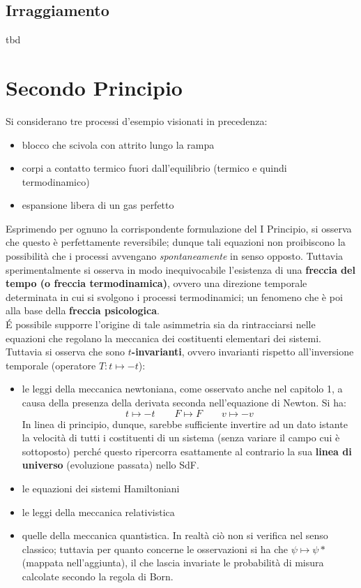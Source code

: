 \documentclass[10pt, oneside]{book}
\begin{document}
\section{Irraggiamento}
tbd

\chapter{Secondo Principio}
Si considerano tre processi d'esempio visionati in precedenza: 
\begin{itemize}
\item blocco che scivola con attrito lungo la rampa
\item corpi a contatto termico fuori dall'equilibrio (termico e quindi termodinamico)
\item espansione libera di un gas perfetto
\end{itemize}
Esprimendo per ognuno la corrispondente formulazione del I Principio, si osserva che questo è perfettamente reversibile; dunque tali equazioni non proibiscono la possibilità che i processi avvengano \textit{spontaneamente} in senso opposto. Tuttavia sperimentalmente si osserva in modo inequivocabile l'esistenza di una \textbf{freccia del tempo (o freccia termodinamica)}, ovvero una direzione temporale determinata in cui si svolgono i processi termodinamici; un fenomeno che è poi alla base della \textbf{freccia psicologica}.\\
\'E possibile supporre l'origine di tale asimmetria sia da rintracciarsi nelle equazioni che regolano la meccanica dei costituenti elementari dei sistemi. Tuttavia si osserva che sono \textbf{$t$-invarianti}, ovvero invarianti rispetto all'inversione temporale (operatore $T: t \mapsto -t$):
\begin{itemize}
\item le leggi della meccanica newtoniana, come osservato anche nel capitolo 1, a causa della presenza della derivata seconda nell'equazione di Newton. Si ha:
\[t \mapsto -t \quad \quad F \mapsto F \quad \quad v \mapsto -v\]
In linea di principio, dunque, sarebbe sufficiente invertire ad un dato istante la velocità di tutti i costituenti di un sistema (senza variare il campo cui è sottoposto) perché questo ripercorra esattamente al contrario la sua \textbf{linea di universo} (evoluzione passata) nello SdF.
\item le equazioni dei sistemi Hamiltoniani
\item le leggi della meccanica relativistica
\item quelle della meccanica quantistica. In realtà ciò non si verifica nel senso classico; tuttavia per quanto concerne le osservazioni si ha che $\psi \mapsto \psi*$ (mappata nell'aggiunta), il che lascia invariate le probabilità di misura calcolate secondo la regola di Born.
\end{itemize}
\end{document}

